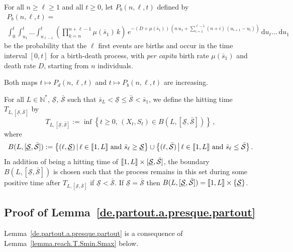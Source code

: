 \documentclass[AHL,Unicode,longabstracts,published]{cedram}
\newcommand{\llbracket}{\mathopen{[\mkern -2.7mu[}}
\newcommand{\rrbracket}{\mathclose{]\mkern -2.7mu]}}
\newcommand{\NN}{\mathbb{N}}
\newcommand{\dif}{\mathrm{d}}
\newcommand{\Smin}{\underline{\mathcal{S}}}
\newcommand{\Smax}{\bar{\mathcal{S}}}
\newcommand{\barmu}{\mu(\bar s_1)}
\newcommand{\1}{\mathbf{1}}
\begin{document}
For all $n\geq \ell\geq 1$ and all $t\geq0$, let $P_b(n,\ell,t)$ defined by
\begin{multline*}
P_b(n,\ell,t) =\\
\int_0^{t} \int_{u_1}^{t}\dots \int_{u_{\ell-1}}^{t}
\left(\prod_{k=n}^{n+\ell-1}\barmu\,k\right)\, e^{-(D+\barmu)\,\left(n\,u_1+
\sum\limits_{i=1}^{\ell-1}(n+i)\,(u_{i+1}-u_{i})\right)}\,
\dif u_\ell \dots\,\dif u_1
\end{multline*}
be the probability that the $\ell$ first events are births and occur in the time interval $[0,t]$ for a birth-death process, with \emph{per capita} birth rate $\barmu$ and death rate $D$, starting from $n$ individuals.


\begin{rema}\label{rk.Pd.Pb.inc}
Both maps $t\mapsto P_d(n,\ell,t)$ and $t\mapsto P_b(n,\ell,t)$ are increasing.
\end{rema}

For all $L\in\NN^*$, $\Smin,\, \Smax$ such that $\bar s_L<\Smin \leq \Smax<\bar s_1$, we define the hitting time $T_{L,[\Smin,\Smax]}$ by
\[
T_{L,[\Smin,\Smax]}:=\inf\left\{t\geq 0,\, (X_t,S_t)\in B(L,[\Smin,\Smax])\right\}\,,
\]
where
\[
B(L,[\Smin,\Smax]):=\big\{(\ell,\Smin) \, | \, \ell \in \llbracket 1,L \rrbracket \text{ and } \bar s_\ell \geq \Smin\big\} \cup 
\big\{(\ell,\Smax) \, \big| \, \ell \in \llbracket 1,L \rrbracket \text{ and } \bar s_\ell \leq \Smax\big\}\,.
\]
In addition of being a hitting time of $\llbracket 1, L \rrbracket \times [\Smin,\Smax]$, the boundary $B(L,[\Smin,\Smax])$ is chosen such that the process remains in this set during some positive time after $T_{L,[\Smin,\Smax]}$ if $\Smin<\Smax$. If $\Smin=\Smax$ then $B(L,[\Smin,\Smax])=\llbracket 1,L \rrbracket \times \{\Smin\}$.



\subsection{Proof of Lemma~\ref{de.partout.a.presque.partout}}\label{sec:partout.a.partout}


Lemma~\ref{de.partout.a.presque.partout} is a consequence of Lemma~\ref{lemma.reach.T.Smin.Smax} below.
\end{document}
